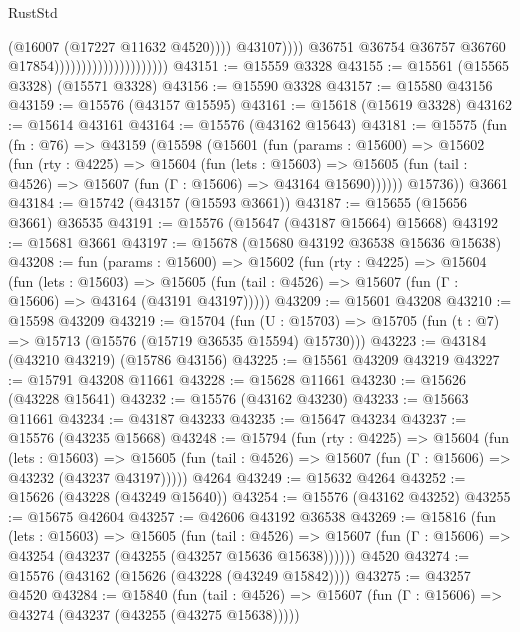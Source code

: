 \begin{lexlean}{RustStd}
\begin{coremodule}
                                                          (@16007 (@17227 @11632 @4520))))
                                                      @43107))))
                                              @36751
                                              @36754
                                              @36757
                                              @36760
                                              @17854)))))))))))))))))))))
@43151 := @15559 @3328
@43155 := @15561 (@15565 @3328) (@15571 @3328)
@43156 := @15590 @3328
@43157 := @15580 @43156
@43159 := @15576 (@43157 @15595)
@43161 := @15618 (@15619 @3328)
@43162 := @15614 @43161
@43164 := @15576 (@43162 @15643)
@43181 := @15575
    (fun (fn : @76) =>
    @43159
      (@15598
        (@15601
          (fun (params : @15600) =>
          @15602
            (fun (rty : @4225) =>
            @15604
              (fun (lets : @15603) =>
              @15605 (fun (tail : @4526) => @15607 (fun (Γ : @15606) => @43164 @15690))))))
        @15736))
    @3661
@43184 := @15742 (@43157 (@15593 @3661))
@43187 := @15655 (@15656 @3661) @36535
@43191 := @15576 (@15647 (@43187 @15664) @15668)
@43192 := @15681 @3661
@43197 := @15678 (@15680 @43192 @36538 @15636 @15638)
@43208 := fun (params : @15600) =>
  @15602
    (fun (rty : @4225) =>
    @15604
      (fun (lets : @15603) =>
      @15605 (fun (tail : @4526) => @15607 (fun (Γ : @15606) => @43164 (@43191 @43197)))))
@43209 := @15601 @43208
@43210 := @15598 @43209
@43219 := @15704
    (fun (U : @15703) => @15705 (fun (t : @7) => @15713 (@15576 (@15719 @36535 @15594) @15730)))
@43223 := @43184 (@43210 @43219) (@15786 @43156)
@43225 := @15561 @43209 @43219
@43227 := @15791 @43208 @11661
@43228 := @15628 @11661
@43230 := @15626 (@43228 @15641)
@43232 := @15576 (@43162 @43230)
@43233 := @15663 @11661
@43234 := @43187 @43233
@43235 := @15647 @43234
@43237 := @15576 (@43235 @15668)
@43248 := @15794
    (fun (rty : @4225) =>
    @15604
      (fun (lets : @15603) =>
      @15605 (fun (tail : @4526) => @15607 (fun (Γ : @15606) => @43232 (@43237 @43197)))))
    @4264
@43249 := @15632 @4264
@43252 := @15626 (@43228 (@43249 @15640))
@43254 := @15576 (@43162 @43252)
@43255 := @15675 @42604
@43257 := @42606 @43192 @36538
@43269 := @15816
    (fun (lets : @15603) =>
    @15605
      (fun (tail : @4526) =>
      @15607 (fun (Γ : @15606) => @43254 (@43237 (@43255 (@43257 @15636 @15638))))))
    @4520
@43274 := @15576 (@43162 (@15626 (@43228 (@43249 @15842))))
@43275 := @43257 @4520
@43284 := @15840
    (fun (tail : @4526) => @15607 (fun (Γ : @15606) => @43274 (@43237 (@43255 (@43275 @15638)))))

\end{coremodule}
\end{lexlean}
